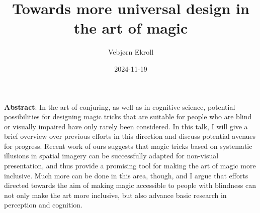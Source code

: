 \documentclass[11pt, oneside]{article}   	%
\title{Towards more universal design in the art of magic}
\author{Vebjørn Ekroll}
\date{2024-11-19}							%
\begin{document}
\maketitle

\noindent \textbf{Abstract}: In the art of conjuring, as well as in cognitive science, potential possibilities for designing magic tricks that are suitable for people who are blind or visually impaired have only rarely been considered. In this talk, I will give a brief overview over previous efforts in this direction and discuss potential avenues for progress. Recent work of ours suggests that magic tricks based on systematic illusions in spatial imagery can be successfully adapted for non-visual presentation, and thus provide a promising tool for making the art of magic more inclusive. Much more can be done in this area, though, and I argue that efforts directed towards the aim of making magic accessible to people with blindness can not only make the art more inclusive, but also advance basic research in perception and cognition.

\end{document}
